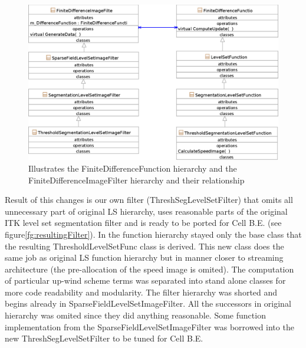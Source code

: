 \begin{figure}
    \centering
    \includegraphics[width=15cm]{data/originalHierarchy}
    \caption[Original ITK thresholding level set filter class hierarchy]
{Illustrates the FiniteDifferenceFunction hierarchy and the FiniteDifferenceImageFilter hierarchy and their relationship}
    \label{fg:originalHierarchy}
\end{figure}

Result of this changes is our own filter (ThreshSegLevelSetFilter) that omits all unnecessary part of original LS hierarchy, uses reasonable parts of the original ITK level set segmentation filter and is ready to be ported for Cell B.E. (see figure\ref{fg:resultingFilter}).
In the function hierarchy stayed only the base class that the resulting ThresholdLevelSetFunc class is derived.
This new class does the same job as original LS function hierarchy but in manner closer to streaming architecture (the pre-allocation of the speed image is omited).
The computation of particular up-wind scheme terms was separated into stand alone classes for more code readability and modularity.
The filter hierarchy was shorted and begins already in SparseFieldLevelSetImageFilter.
All the successors in original hierarchy was omited since they did anything reasonable.
Some function implementation from the SparseFieldLevelSetImageFilter was borrowed into the new ThreshSegLevelSetFilter to be tuned for Cell B.E.

